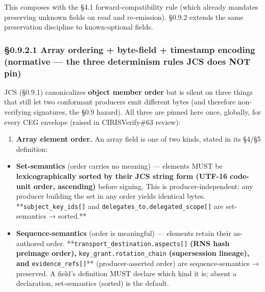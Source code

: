 \documentclass[11pt]{article}
\begin{document}
This composes with the §4.1 forward-compatibility rule (which already mandates preserving unknown fields on read and re-emission). §0.9.2 extends the same preservation discipline to known-optional fields.


\subsubsection*{§0.9.2.1 Array ordering + byte-field + timestamp encoding (normative — the three determinism rules JCS does NOT pin)}


JCS (§0.9.1) canonicalizes \textbf{object member order} but is silent on three things that still let two conformant producers emit different bytes (and therefore non-verifying signatures, the §0.9 hazard). All three are pinned here once, globally, for every CEG envelope (raised in CIRISVerify\#63 review):


\begin{enumerate}\setlength\itemsep{0pt}
\item \textbf{Array element order.} An array field is one of two kinds, stated in its §4/§5 definition:
\end{enumerate}

\begin{itemize}\setlength\itemsep{0pt}
\item \textbf{Set-semantics} (order carries no meaning) — elements MUST be \textbf{lexicographically sorted by their JCS string form (UTF-16 code-unit order, ascending)} before signing. This is producer-independent: any producer building the set in any order yields identical bytes. **\texttt{subject\_key\_ids[]} and \texttt{delegates\_to.delegated\_scope[]} are set-semantics → sorted.**
\item \textbf{Sequence-semantics} (order is meaningful) — elements retain their as-authored order. **\texttt{transport\_destination.aspects[]}\textbf{ (RNS hash preimage order), }\texttt{key\_grant.rotation\_chain}\textbf{ (supersession lineage), and }\texttt{evidence\_refs[]}** (producer-asserted order) are sequence-semantics → preserved. A field's definition MUST declare which kind it is; absent a declaration, set-semantics (sorted) is the default.
\end{itemize}
\end{document}
